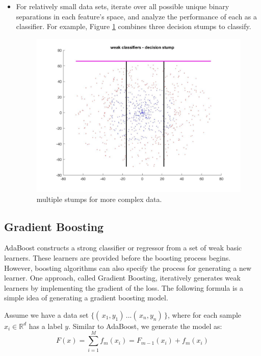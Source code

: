 \documentclass[10pt,twocolumn,letterpaper]{article}
\begin{document}
\begin{itemize}
\item For relatively small data sets, iterate over all possible unique binary separations in each feature's space, and analyze the performance of each as a classifier. For example, Figure \ref{fig:stump2} combines three decision stumps to classify.
\begin{figure}[h!]
  \includegraphics[width=\linewidth]{decsiontree_3.jpg}
  \caption{multiple stumps for more complex data.}
  \label{fig:stump2}
\end{figure}
\end{itemize}

\subsection{Gradient Boosting}

AdaBoost constructs a strong classifier or regressor from a set of weak basic learners. These learners are provided before the boosting process begins. However, boosting algorithms can also specify the process for generating a new learner. One approach, called Gradient Boosting, iteratively generates weak learners by implementing the gradient of the loss. The following formula is a simple idea of generating a gradient boosting model.

Assume we have a data set 
$\{(\,x_1,y_1)\,...(\,x_n,y_n)\,\}$, where for each sample $x_i\in \mathbb {R}^d$ has a label $y$. Similar to AdaBoost, we generate the model as:
\begin{equation} F(x) = \sum_{i=1}^{M} f_m(x_i) = F_{m-1}(x_i) + f_m(x_i) \end{equation}
\end{document}
